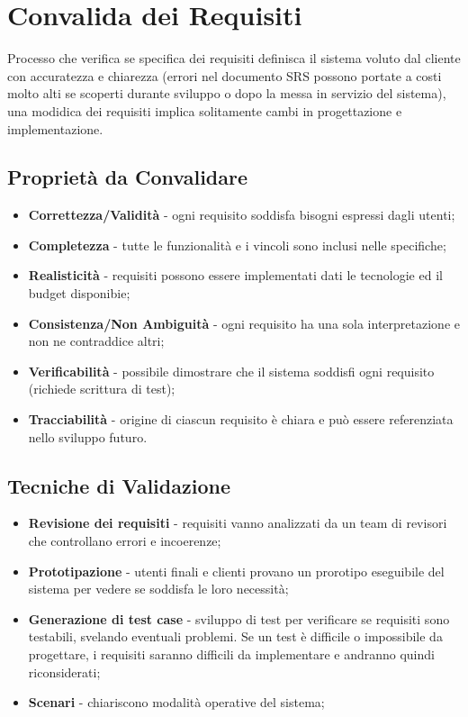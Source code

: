 \documentclass{article}
\begin{document}
  \section{Convalida dei Requisiti}
    Processo che verifica se specifica dei requisiti definisca il sistema voluto dal cliente con accuratezza e chiarezza (errori nel documento SRS possono portate a costi molto alti se scoperti durante sviluppo o dopo la messa in servizio del sistema), una modidica dei requisiti implica solitamente cambi in progettazione e implementazione. 
    \subsection{Proprietà da Convalidare}
      \begin{itemize}
        \item \textbf{Correttezza/Validità} - ogni requisito soddisfa bisogni espressi dagli utenti;
        \item \textbf{Completezza} - tutte le funzionalità e i vincoli sono inclusi nelle specifiche;
        \item \textbf{Realisticità} - requisiti possono essere implementati dati le tecnologie ed il budget disponibie;
        \item \textbf{Consistenza/Non Ambiguità} - ogni requisito ha una sola interpretazione e non ne contraddice altri;
        \item \textbf{Verificabilità} - possibile dimostrare che il sistema soddisfi ogni requisito (richiede scrittura di test);
        \item \textbf{Tracciabilità} - origine di ciascun requisito è chiara e può essere referenziata nello sviluppo futuro. 
      \end{itemize}
    \subsection{Tecniche di Validazione}
      \begin{itemize}
        \item \textbf{Revisione dei requisiti} - requisiti vanno analizzati da un team di revisori che controllano errori e incoerenze;
        \item \textbf{Prototipazione} - utenti finali e clienti provano un prorotipo eseguibile del sistema per vedere se soddisfa le loro necessità;
        \item \textbf{Generazione di test case} - sviluppo di test per verificare se requisiti sono testabili, svelando eventuali problemi. Se un test è difficile o impossibile da progettare, i requisiti saranno difficili da implementare e andranno quindi riconsiderati;
        \item \textbf{Scenari} - chiariscono modalità operative del sistema;
      \end{itemize}
\end{document}

